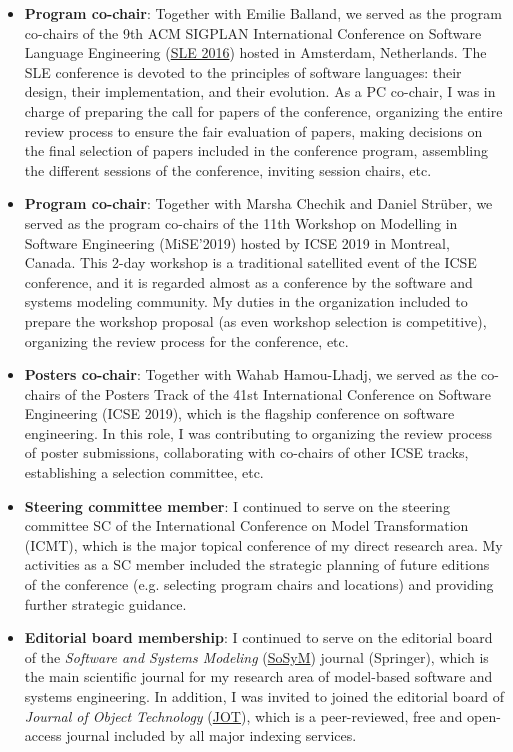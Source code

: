 \begin{itemize}
\item \textbf{Program co-chair}: Together with Emilie Balland, we served as the program co-chairs of the 9th ACM SIGPLAN International Conference on Software Language Engineering (\href{https://www.sleconf.org/2016/}{SLE 2016}) hosted in Amsterdam, Netherlands. The SLE conference is devoted to the principles of software languages: their design, their implementation, and their evolution. As a PC co-chair, I was in charge of preparing the call for papers of the conference, organizing the entire review process to ensure the fair evaluation of papers, making decisions on the final selection of papers included in the conference program, assembling the different sessions of the conference, inviting session chairs, etc. 

\item \textbf{Program co-chair}: Together with Marsha Chechik and Daniel Strüber, we served as the program co-chairs of the 11th Workshop on Modelling in Software Engineering (MiSE’2019) hosted by ICSE 2019 in Montreal, Canada. This 2-day workshop is a traditional satellited event of the ICSE conference, and it is regarded almost as a conference by the software and systems modeling community. My duties in the organization included to prepare the workshop proposal (as even workshop selection is competitive), organizing the review process for the conference, etc.

\item \textbf{Posters co-chair}: Together with Wahab Hamou-Lhadj, we served as the co-chairs of the Posters Track of the 41st International Conference on Software Engineering (ICSE 2019), which is the flagship conference on software engineering. In this role, I was contributing to organizing the review process of poster submissions, collaborating with co-chairs of other ICSE tracks, establishing a selection committee, etc.

\item \textbf{Steering committee member}: I continued to serve on the steering committee SC of the International Conference on Model Transformation (ICMT), which is the major topical conference of my direct research area. My activities as a SC member included the strategic planning of future editions of the conference (e.g. selecting program chairs and locations) and providing further strategic guidance.

\item \textbf{Editorial board membership}: I continued to serve on the editorial board of the \emph{Software and Systems Modeling} (\href{http://sosym.org/}{SoSyM}) journal (Springer), which is the main scientific journal for my research area of model-based software and systems engineering. In addition, I was invited to joined the editorial board of \emph{Journal of Object Technology} (\href{http://www.jot.fm/}{JOT}), which is a peer-reviewed, free and open-access journal included by all major indexing services. 
\end{itemize}

